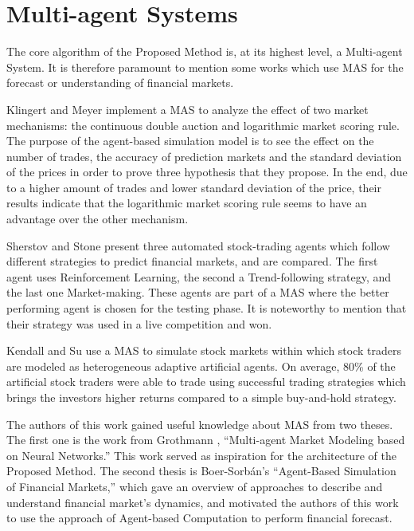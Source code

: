 \section{Multi-agent Systems}
\label{section:multi-agent-systems}

The core algorithm of the Proposed Method is, at its highest level, a
Multi-agent System. It is therefore paramount to mention some works which use
MAS for the forecast or understanding of financial markets.

Klingert and Meyer \cite{Klingert_2012} implement a MAS to analyze the effect of
two market mechanisms: the continuous double auction and logarithmic market
scoring rule. The purpose of the agent-based simulation model is to see the
effect on the number of trades, the accuracy of prediction markets and the
standard deviation of the prices in order to prove three hypothesis that they
propose. In the end, due to a higher amount of trades and lower standard
deviation of the price, their results indicate that the logarithmic market
scoring rule seems to have an advantage over the other mechanism.

Sherstov and Stone \cite{Sherstov2005} present three automated stock-trading
agents which follow different strategies to predict financial markets, and are
compared. The first agent uses Reinforcement Learning, the second a
Trend-following strategy, and the last one Market-making. These agents are part
of a MAS where the better performing agent is chosen for the testing phase. It
is noteworthy to mention that their strategy was used in a live competition and
won.

Kendall and Su \cite{Kendall2003} use a MAS to simulate stock markets within
which stock traders are modeled as heterogeneous adaptive artificial agents. On
average, 80\% of the artificial stock traders were able to trade using
successful trading strategies which brings the investors higher returns compared
to a simple buy-and-hold strategy.

The authors of this work gained useful knowledge about MAS from two theses. The
first one is the work from Grothmann \cite{Grothmann2002}, ``Multi-agent Market
Modeling based on Neural Networks.'' This work served as inspiration for the
architecture of the Proposed Method. The second thesis is Boer-Sorb{\'{a}}n's
``Agent-Based Simulation of Financial Markets,'' which gave an overview of
approaches to describe and understand financial market's dynamics, and motivated
the authors of this work to use the approach of Agent-based Computation to
perform financial forecast.

